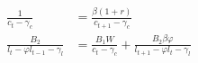   \begin{align}
    \frac{1}{c_t -\gamma_c} &=\frac{\beta(1+r)}{c_{t+1}-\gamma_c} \label{eq:sg_euler_c} \\
    \frac{B_2}{l_t - \varphi l_{t-1} - \gamma_l} &= \frac{B_1 W}{c_t - \gamma_c} + \frac{B_2 \beta \varphi}{l_{t+1}-\varphi l_t - \gamma_l} \label{eq:sg_euler_l}
  \end{align}

